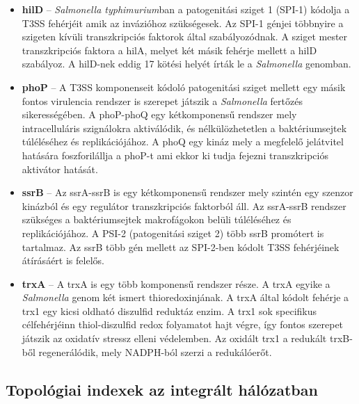 \documentclass[a4paper,12pt]{article}
\begin{document}
			\begin{itemize}
				\item \textbf{hilD} -- \textit{Salmonella typhimurium}ban a patogenitási sziget 1 (SPI-1) kódolja a T3SS fehérjéit amik az invázióhoz szükségesek. Az SPI-1 génjei többnyire a szigeten kívüli transzkripciós faktorok által szabályozódnak. A sziget mester transzkripciós faktora a hilA, melyet két másik fehérje mellett a hilD szabályoz. A hilD-nek eddig 17 kötési helyét írták le a \textit{Salmonella} genomban. \cite{hilD}

				\item \textbf{phoP} -- A T3SS komponenseit kódoló patogenitási sziget mellett egy másik fontos virulencia rendszer is szerepet játszik a \textit{Salmonella} fertőzés sikerességében. 
				A phoP-phoQ egy kétkomponensű rendszer mely intracelluláris szignálokra aktiválódik, és nélkülözhetetlen a baktériumsejtek túléléséhez és replikációjához. A phoQ egy kináz mely a megfelelő jelátvitel hatására foszforilállja a phoP-t ami ekkor ki tudja fejezni transzkripciós aktivátor hatását. \cite{phoP}
				
				\item \textbf{ssrB} -- Az ssrA-ssrB is egy kétkomponensű rendszer mely szintén egy szenzor kinázból és egy regulátor transzkripciós faktorból áll. Az ssrA-ssrB rendszer szükséges a baktériumsejtek makrofágokon belüli túléléséhez és replikációjához. A PSI-2 (patogenitási sziget 2) több ssrB promótert is tartalmaz. Az ssrB több gén mellett az SPI-2-ben kódolt T3SS fehérjéinek átírásáért is felelős. \cite{ssrB}
				
				\item \textbf{trxA} -- A trxA is egy több komponensű rendszer része. A trxA egyike a \textit{Salmonella} genom két ismert thioredoxinjának. A trxA által kódolt fehérje a trx1 egy kicsi oldható diszulfid reduktáz enzim.  A trx1 sok specifikus célfehérjéinn thiol-diszulfid redox folyamatot hajt végre, így fontos szerepet játszik az oxidatív stressz elleni védelemben. Az oxidált trx1 a redukált trxB-ből regenerálódik, mely NADPH-ból szerzi a redukálóerőt. \cite{trxA}
			\end{itemize}
			
	\subsection{Topológiai indexek az integrált hálózatban}
			
\end{document}
